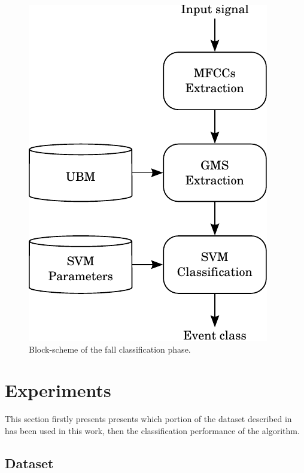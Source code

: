 \begin{figure}[t]
	\centering
	\includegraphics[width=0.333\columnwidth]{img/scheme_classify_bn.pdf}
	\caption{Block-scheme of the fall classification phase.}
	\label{fig:scheme-classify-color}
\end{figure}

\section{Experiments}\label{sec:experiments}

This section firstly presents presents which portion of the dataset described in  has been used in this work, then the classification performance of the algorithm. 

\subsection{Dataset}

